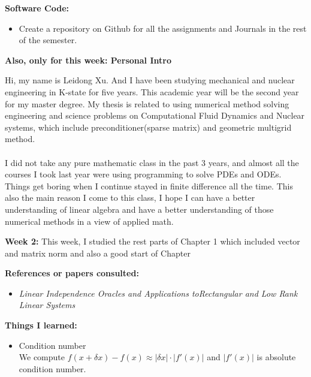 \documentclass{article}
\begin{document}
\textbf{Software Code:}
 \begin{itemize}
\item Create a repository on Github for all the assignments and Journals in the rest of the semester.
\end{itemize}


\textbf{Also, only for this week: Personal Intro}

Hi, my name is Leidong Xu. And I have been studying mechanical and nuclear engineering in K-state for five years. This academic year will be the second year for my master degree. My thesis is related to using numerical method solving engineering and science problems on Computational Fluid Dynamics and Nuclear systems, which include preconditioner(sparse matrix) and geometric multigrid method.\\ \\ I did not take any pure mathematic class in the past 3 years, and almost all the courses I took last year were using programming to solve PDEs and ODEs. Things get boring when I continue stayed in finite difference all the time. This also the main reason I come to this class, I hope I can have a better understanding of linear algebra and have a better understanding of those numerical methods in a view of applied math.   


\newpage 

\textbf{Week 2:}
This week, I studied the rest parts of Chapter 1 which included vector and matrix norm and also a good start of Chapter


\textbf{References or papers consulted:}
\begin{itemize}

\item {\em Linear Independence Oracles and Applications toRectangular and Low Rank Linear Systems}

\end{itemize}

\textbf{Things I learned:}
\begin{itemize}
\item Condition number\\
We compute $f(x+\delta x)-f(x) \approx |\delta x|\cdot |f'(x)|$ and $|f'(x)|$ is absolute condition number.
\end{itemize}
\end{document}
